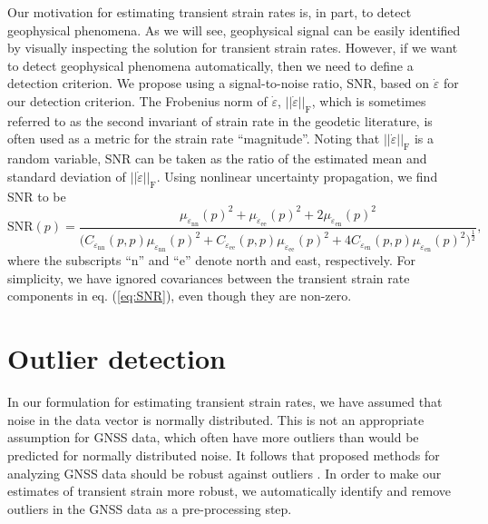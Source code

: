 \documentclass[extra,mreferee]{gji}
\begin{document}
Our motivation for estimating transient strain rates is, in part, to detect geophysical phenomena. As we will see, geophysical signal can be easily identified by visually inspecting the solution for transient strain rates. However, if we want to detect geophysical phenomena automatically, then we need to define a detection criterion. We propose using a signal-to-noise ratio, SNR, based on $\dot\varepsilon$ for our detection criterion. The Frobenius norm of $\dot\varepsilon$, $||\dot\varepsilon||_\mathrm{F}$, which is sometimes referred to as the second invariant of strain rate in the geodetic literature, is often used as a metric for the strain rate ``magnitude''. Noting that $||\dot\varepsilon||_\mathrm{F}$ is a random variable, SNR can be taken as the ratio of the estimated mean and standard deviation of $||\dot\varepsilon||_\mathrm{F}$. Using nonlinear uncertainty propagation, we find SNR to be  
\begin{equation}\label{eq:SNR}
\mathrm{SNR}(p) = \frac{\mu_{\dot\varepsilon_\mathrm{nn}}(p)^2 +
                        \mu_{\dot\varepsilon_\mathrm{ee}}(p)^2 +
                        2\mu_{\dot\varepsilon_\mathrm{en}}(p)^2}
                       {\big(C_{\dot\varepsilon_\mathrm{nn}}(p,p)\mu_{\dot\varepsilon_\mathrm{nn}}(p)^2 + 
                              C_{\dot\varepsilon_\mathrm{ee}}(p,p)\mu_{\dot\varepsilon_\mathrm{ee}}(p)^2 + 
                              4C_{\dot\varepsilon_\mathrm{en}}(p,p)\mu_{\dot\varepsilon_\mathrm{en}}(p)^2
                        \big)^{\frac{1}{2}}}
,
\end{equation}
where the subscripts ``n'' and ``e'' denote north and east, respectively. For simplicity, we have ignored covariances between the transient strain rate components in eq. (\ref{eq:SNR}), even though they are non-zero.  

\section{Outlier detection}\label{sec:Outlier}
In our formulation for estimating transient strain rates, we have assumed that noise in the data vector is normally distributed. This is not an appropriate assumption for GNSS data, which often have more outliers than would be predicted for normally distributed noise. It follows that proposed methods for analyzing GNSS data should be robust against outliers \citep[e.g.,][]{Blewitt2016}. In order to make our estimates of transient strain more robust, we automatically identify and remove outliers in the GNSS data as a pre-processing step.
\end{document}
